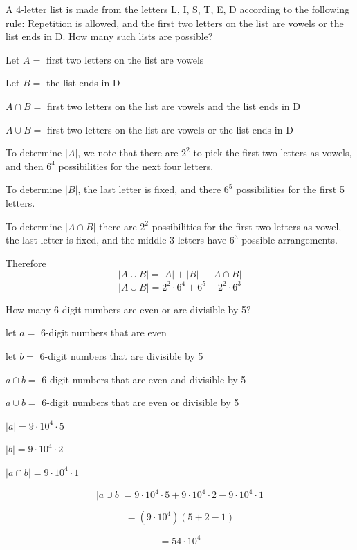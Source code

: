 \documentclass[openany, 11pt]{book}
\begin{document}
\begin{exercise}{}{}
	A 4-letter list is made from the letters L, I, S, T, E, D
	according to the following rule: Repetition is allowed, and the first two
	letters on the list are vowels or the list ends in D. How many such lists are
	possible?
	\begin{alist}
		\item Let $A=$ first two letters on the list are vowels
		\item Let $B=$ the list ends in D
		\item $A\cap B=$ first two letters on the list are vowels and the list ends in D
		\item $A\cup B=$ first two letters on the list are vowels or the list ends in D
		\item To determine $|A|$, we note that there are $2^2$ to pick the first two
		letters as vowels, and then $6^4$ possibilities for the next four letters.
		\item To determine $|B|$, the last letter is fixed, and there $6^5$
		possibilities for the first 5 letters.
		\item To determine $|A\cap B|$ there are $2^2$ possibilities for the first two
		letters as vowel, the last letter is fixed, and the middle 3 letters have
		$6^3$ possible arrangements.
		\item Therefore
		$$|A \cup B | = |A| + |B| - |A \cap B|$$
		$$|A \cup B | = 2^2\cdot6^4 + 6^5 - 2^2\cdot6^3$$
	\end{alist}
\end{exercise}

\begin{exercise}{}{}
	How many 6-digit numbers are even or are divisible by 5?
	\begin{alist}
		\item let $a=$ 6-digit numbers that are even
		\item let $b=$ 6-digit numbers that are divisible by 5
		\item $a\cap b=$ 6-digit numbers that are even and divisible by 5
		\item $a\cup b=$ 6-digit numbers that are even or divisible by 5
		\item $|a|=9\cdot10^4\cdot5$
		\item $|b|=9\cdot10^4\cdot2$
		\item $|a\cap b|= 9\cdot10^4\cdot1$
		\item $$|a\cup b|= 9\cdot10^4\cdot5 + 9\cdot10^4\cdot2 - 9\cdot10^4\cdot1$$
		\item $$= (9\cdot10^4)(5 + 2 -1)$$
		\item $$= 54\cdot10^4$$
	\end{alist}
\end{exercise}
\end{document}
